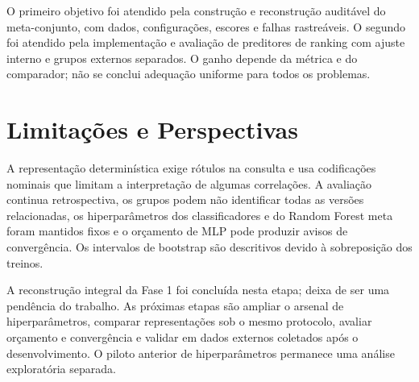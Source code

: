 O primeiro objetivo foi atendido pela construção e reconstrução auditável do meta-conjunto, com dados, configurações, escores e falhas rastreáveis. O segundo foi atendido pela implementação e avaliação de preditores de ranking com ajuste interno e grupos externos separados. O ganho depende da métrica e do comparador; não se conclui adequação uniforme para todos os problemas.

\section{Limitações e Perspectivas}\label{sec:limitacoes}

A representação determinística exige rótulos na consulta e usa codificações nominais que limitam a interpretação de algumas correlações. A avaliação continua retrospectiva, os grupos podem não identificar todas as versões relacionadas, os hiperparâmetros dos classificadores e do Random Forest meta foram mantidos fixos e o orçamento de MLP pode produzir avisos de convergência. Os intervalos de bootstrap são descritivos devido à sobreposição dos treinos.

A reconstrução integral da Fase 1 foi concluída nesta etapa; deixa de ser uma pendência do trabalho. As próximas etapas são ampliar o arsenal de hiperparâmetros, comparar representações sob o mesmo protocolo, avaliar orçamento e convergência e validar em dados externos coletados após o desenvolvimento. O piloto anterior de hiperparâmetros permanece uma análise exploratória separada.
